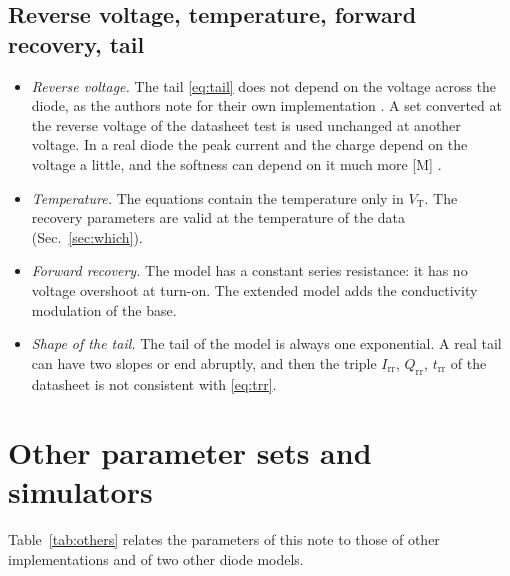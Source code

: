 \documentclass[10pt,a4paper]{scrartcl}
\newcommand{\Irr}{I_\mathrm{rr}}
\newcommand{\Qrr}{Q_\mathrm{rr}}
\newcommand{\trr}{t_\mathrm{rr}}
\newcommand{\VT}{V_\mathrm{T}}
\begin{document}
\subsection{Reverse voltage, temperature, forward recovery, tail}
\begin{itemize}
\item \emph{Reverse voltage.} The tail \eqref{eq:tail} does not depend on the voltage across the diode, as the authors note for their own implementation \cite{pemodels}. A set converted at the reverse voltage of the datasheet test is used unchanged at another voltage. In a real diode the peak current and the charge depend on the voltage a little, and the softness can depend on it much more [M] \cite{lutz}.
\item \emph{Temperature.} The equations contain the temperature only in $\VT$. The recovery parameters are valid at the temperature of the data (Sec.~\ref{sec:which}).
\item \emph{Forward recovery.} The model has a constant series resistance: it has no voltage overshoot at turn-on. The extended model \cite{ma1993} adds the conductivity modulation of the base.
\item \emph{Shape of the tail.} The tail of the model is always one exponential. A real tail can have two slopes or end abruptly, and then the triple $\Irr$, $\Qrr$, $\trr$ of the datasheet is not consistent with \eqref{eq:trr}.
\end{itemize}

\section{Other parameter sets and simulators}
\label{sec:others}
Table~\ref{tab:others} relates the parameters of this note to those of other implementations and of two other diode models.
\end{document}
